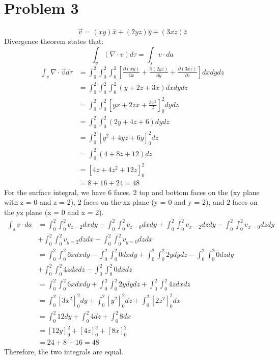 \documentclass[12pt]{article}
\begin{document}
\section*{Problem 3}
\[\vec{v} = (xy) \hat{x} + (2yz)\hat{y} + (3xz) \hat{z}\]
Divergence theorem states that:
\[\int_{v}^{}(\nabla \cdot v)d\tau = \int_{s}^{} v\cdot da \]
\begin{align*}
	\int_{v}^{}\nabla \cdot \vec{v} d\tau & = \int_{0}^{2} \int_{0}^{2} \int_{0}^{2} \left[\frac{\partial(xy)}{\partial x} + \frac{\partial(2yz)}{\partial y} + \frac{\partial (3xz)}{\partial z}\right] dx dy dz \\
	&= \int_{0}^{2} \int_{0}^{2} \int_{0}^{2} (y + 2z + 3x) dx dy dz \\
	&= \int_{0}^{2} \int_{0}^{2} \left[yx + 2zx + \frac{3x^2}{2}\right]_{0}^{2} dy dz \\
	&= \int_{0}^{2} \int_{0}^{2} (2y + 4z + 6) dy dz \\
	&= \int_{0}^{2} \left[y^2 + 4yz + 6y\right]_{0}^{2} dz \\
	&= \int_{0}^{2} (4 + 8z + 12) dz \\
	&= \left[4z + 4z^2 + 12z\right]_{0}^{2} \\
	&= 8 + 16 + 24 = 48
\end{align*}
For the surface integral, we have 6 faces. 2 top and bottom faces on the (xy plane with z = 0 and z = 2), 2 faces on the xz plane (y = 0 and y = 2), and 2 faces on the yz plane (x = 0 and x = 2). 
\begin{align*}
	\int_{s}^{} v\cdot da &= \int_{0}^{2} \int_{0}^{2} v_{z=2} dx dy - \int_{0}^{2} \int_{0}^{2} v_{z=0} dx dy  + \int_{0}^{2} \int_{0}^{2} v_{x=2} dz dy - \int_{0}^{2} \int_{0}^{2} v_{x=0} dz dy \\
	& +\int_{0}^{2} \int_{0}^{2} v_{y=2} dz dx - \int_{0}^{2} \int_{0}^{2} v_{y=0} dz dx \\
	&= \int_{0}^{2} \int_{0}^{2} 6x dx dy - \int_{0}^{2} \int_{0}^{2} 0 dx dy  + \int_{0}^{2} \int_{0}^{2} 2y dy dz - \int_{0}^{2} \int_{0}^{2} 0 dz dy \\
	& +\int_{0}^{2} \int_{0}^{2} 4z dx dz - \int_{0}^{2} \int_{0}^{2}0 dx dz \\
	&= \int_{0}^{2} \int_{0}^{2} 6x dx dy + \int_{0}^{2} \int_{0}^{2} 2y dy dz + \int_{0}^{2} \int_{0}^{2} 4z dx dz \\
	&= \int_{0}^{2} \left[3x^2\right]_{0}^{2} dy + \int_{0}^{2} \left[y^2\right]_{0}^{2} dz + \int_{0}^{2} \left[2z^2\right]_{0}^{2} dx \\
	&= \int_{0}^{2} 12 dy + \int_{0}^{2} 4 dz + \int_{0}^{2} 8 dx \\
	&= \left[12y\right]_{0}^{2} + \left[4z\right]_{0}^{2} + \left[8x\right]_{0}^{2} \\
	&= 24 + 8 + 16 = 48
\end{align*}
Therefore, the two integrals are equal.
\end{document}
